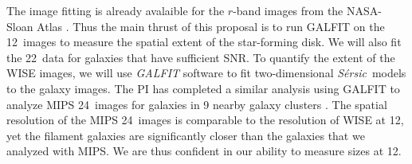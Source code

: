 \documentclass[12pt, preprint]{aastex}
\newcommand{\sers}{{\it S\'{e}rsic}}
\begin{document}
{%


The image fitting is already avalaible for the $r$-band images from
the NASA-Sloan Atlas \citep{blanton11}.  Thus the main thrust of this proposal is to run
GALFIT on the 12\micron \ images to measure the spatial extent of the
star-forming disk.  We will also fit the 22\micron \ data for galaxies
that have sufficient SNR.
To quantify the extent of the WISE images, 
we will use  {\it GALFIT} software \citep{peng02}
to fit two-dimensional \sers \ models to the galaxy images.  
The PI has completed a similar analysis using GALFIT to analyze MIPS
24\micron \ images for galaxies in 9 nearby galaxy clusters \citep{finn16}.  The
spatial resolution of the MIPS 24\micron \ images is comparable to the
resolution of WISE at 12\micron, yet the filament galaxies are
significantly closer than the galaxies that we analyzed with MIPS.
We are thus confident in our ability to measure sizes at 12\micron.  

}
\end{document}
